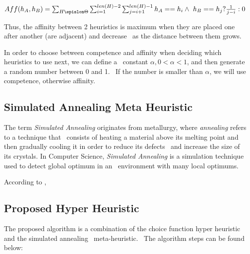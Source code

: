 \(  Aff(h_A, h_B) = \sum_{H \epislon \Theta} \sum_{i=1}^{len(H) - 2} \sum_{j=i+1}^{len(H) - 1} h_A == h_i \wedge \
h_B == h_j ? \frac{1}{j - i} : 0 \) %

Thus, the affinity between 2 heuristics is maximum when they are placed one after another (are adjacent) and decrease \
as the distance between them grows.

In order to choose between competence and affinity when deciding which heuristics to use next, we can define a \
constant $\alpha,  0 < \alpha < 1$, and then generate a random number between 0 and 1. \
If the number is smaller than $\alpha$, we will use competence, otherwise affinity. %


\subsection{Simulated Annealing Meta Heuristic}
\label{subsec:analysis-simulated-annealing}
The term \textit{Simulated Annealing} originates from metallurgy, where \textit{annealing} refers to a technique that \
consists of heating a material above its melting point and then gradually cooling it in order to reduce its defects \
and increase the size of its crystals.
In Computer Science, \textit{Simulated Annealing} is a simulation technique used to detect global optimum in an \
environment with many local optimums.

According to \cite{springer1}, \ %


\subsection{Proposed Hyper Heuristic}
\label{subsec:analysis-proposed-hh}
The proposed algorithm is a combination of the choice function hyper heuristic and the simulated annealing \
meta-heuristic. \
The algorithm steps can be found below: %


